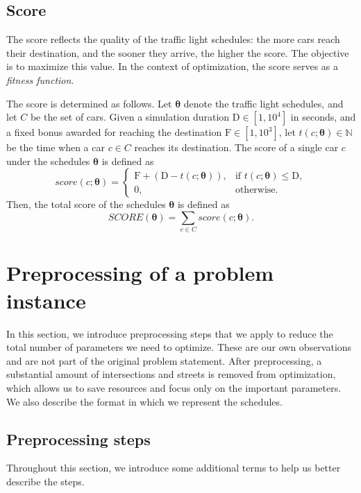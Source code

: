 \subsection{Score}

The score reflects the quality of the traffic light schedules: the more cars reach their destination, and the sooner they arrive, the higher the score.
The objective is to maximize this value.
In the context of optimization, the score serves as a \textit{fitness function}.

The score is determined as follows. Let $\bm{\theta}$ denote the traffic light schedules, and let $C$ be the set of cars.
Given a simulation duration $\mathrm{D} \in [1, 10^4]$ in seconds,
and a fixed bonus awarded for reaching the destination $\mathrm{F} \in [1, 10^3]$,
let $t(c; \bm{\theta}) \in \mathbb{N}$ be the time when a car $c \in C$ reaches its destination.
The score of a single car $c$ under the schedules $\bm{\theta}$ is defined as
\begin{equation}
    score(c; \bm{\theta}) =
    \begin{cases}
        \mathrm{F} + (\mathrm{D} - t(c; \bm{\theta})), & \text{if $t(c; \bm{\theta}) \leq \mathrm{D}$}, \\
        0, & \text{otherwise}.
    \end{cases}
\end{equation}
Then, the total score of the schedules $\bm{\theta}$ is defined as
\begin{equation}
    SCORE(\bm{\theta}) = \sum_{c \in C} score(c; \bm{\theta}).
\end{equation}

\section{Preprocessing of a problem instance} \label{sec:preprocessing}

In this section, we introduce preprocessing steps that we apply to reduce the total number of parameters we need to optimize.
These are our own observations and are not part of the original problem statement. After preprocessing, a substantial amount of intersections and streets is removed from optimization, which allows us to save resources and focus only on the important parameters. We also describe the format in which we represent the schedules.

\subsection{Preprocessing steps}
Throughout this section, we introduce some additional terms to help us better describe the steps.

